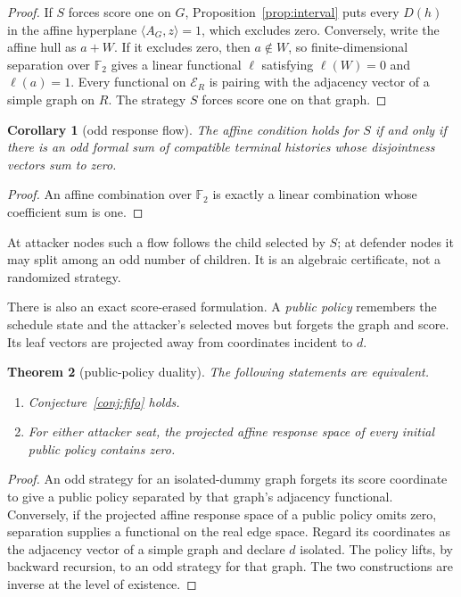 \documentclass[11pt]{article}
\newtheorem{theorem}{Theorem}[section]
\newtheorem{corollary}[theorem]{Corollary}
\theoremstyle{definition}
\theoremstyle{remark}
\begin{document}
\begin{proof}
If $S$ forces score one on $G$, Proposition~\ref{prop:interval} puts every
$D(h)$ in the affine hyperplane $\langle A_G,z\rangle=1$, which excludes
zero.  Conversely, write the affine hull as $a+W$.  If it excludes zero,
then $a\notin W$, so finite-dimensional separation over $\mathbb F_2$
gives a linear functional $\ell$ satisfying $\ell(W)=0$ and $\ell(a)=1$.
Every functional on $\mathcal E_R$ is pairing with the adjacency vector of
a simple graph on $R$.  The strategy $S$ forces score one on that graph.
\end{proof}

\begin{corollary}[odd response flow]\label{cor:flow}
The affine condition holds for $S$ if and only if there is an odd formal
sum of compatible terminal histories whose disjointness vectors sum to zero.
\end{corollary}

\begin{proof}
An affine combination over $\mathbb F_2$ is exactly a linear combination
whose coefficient sum is one.
\end{proof}

At attacker nodes such a flow follows the child selected by $S$; at defender
nodes it may split among an odd number of children.  It is an algebraic
certificate, not a randomized strategy.

There is also an exact score-erased formulation.  A \emph{public policy}
remembers the schedule state and the attacker's selected moves but forgets
the graph and score.  Its leaf vectors are projected away from coordinates
incident to $d$.

\begin{theorem}[public-policy duality]\label{thm:public-duality}
The following statements are equivalent.
\begin{enumerate}
\item Conjecture~\ref{conj:fifo} holds.
\item For either attacker seat, the projected affine response space of every
      initial public policy contains zero.
\end{enumerate}
\end{theorem}

\begin{proof}
An odd strategy for an isolated-dummy graph forgets its score coordinate to
give a public policy separated by that graph's adjacency functional.
Conversely, if the projected affine response space of a public policy omits
zero, separation supplies a functional on the real edge space.  Regard its
coordinates as the adjacency vector of a simple graph and declare $d$
isolated.  The policy lifts, by backward recursion, to an odd strategy for
that graph.  The two constructions are inverse at the level of existence.
\end{proof}
\end{document}
